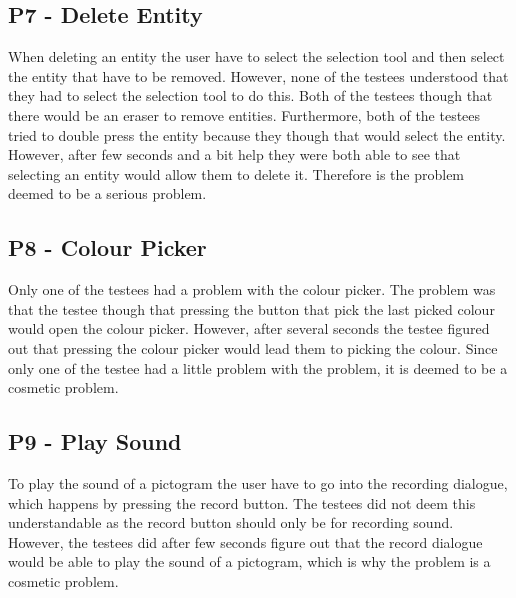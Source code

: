 \subsection*{P7 - Delete Entity}
When deleting an entity the user have to select the selection tool and then select the entity that have to be removed.
However, none of the testees understood that they had to select the selection tool to do this.
Both of the testees though that there would be an eraser to remove entities.
Furthermore, both of the testees tried to double press the entity because they though that would select the entity.
However, after few seconds and a bit help they were both able to see that selecting an entity would allow them to delete it.
Therefore is the problem deemed to be a serious problem. 

\subsection*{P8 - Colour Picker}
Only one of the testees had a problem with the colour picker.
The problem was that the testee though that pressing the button that pick the last picked colour would open the colour picker.
However, after several seconds the testee figured out that pressing the colour picker would lead them to picking the colour.
Since only one of the testee had a little problem with the problem, it is deemed to be a cosmetic problem.

\subsection*{P9 - Play Sound}
To play the sound of a pictogram the user have to go into the recording dialogue, which happens by pressing the record button.
The testees did not deem this understandable as the record button should only be for recording sound.
However, the testees did after few seconds figure out that the record dialogue would be able to play the sound of a pictogram, which is why the problem is a cosmetic problem.
